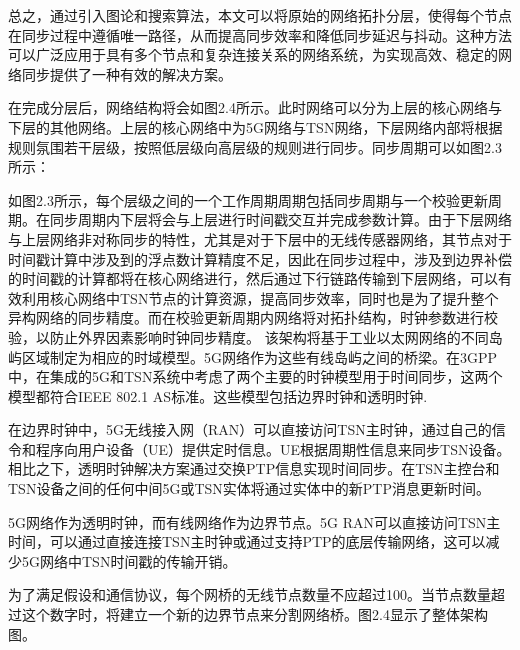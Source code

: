 \documentclass[UTF8,a4paper,12pt]{ctexart}
\numberwithin{equation}{section}
\begin{document}
总之，通过引入图论和搜索算法，本文可以将原始的网络拓扑分层，使得每个节点在同步过程中遵循唯一路径，从而提高同步效率和降低同步延迟与抖动。这种方法可以广泛应用于具有多个节点和复杂连接关系的网络系统，为实现高效、稳定的网络同步提供了一种有效的解决方案。


在完成分层后，网络结构将会如图2.4所示。此时网络可以分为上层的核心网络与下层的其他网络。上层的核心网络中为5G网络与TSN网络，下层网络内部将根据规则氛围若干层级，按照低层级向高层级的规则进行同步。同步周期可以如图2.3所示：

\begin{figure}[htb]
\end{figure}
如图2.3所示，每个层级之间的一个工作周期周期包括同步周期与一个校验更新周期。在同步周期内下层将会与上层进行时间戳交互并完成参数计算。由于下层网络与上层网络非对称同步的特性，尤其是对于下层中的无线传感器网络，其节点对于时间戳计算中涉及到的浮点数计算精度不足，因此在同步过程中，涉及到边界补偿的时间戳的计算都将在核心网络进行，然后通过下行链路传输到下层网络，可以有效利用核心网络中TSN节点的计算资源，提高同步效率，同时也是为了提升整个异构网络的同步精度。而在校验更新周期内网络将对拓扑结构，时钟参数进行校验，以防止外界因素影响时钟同步精度。
该架构将基于工业以太网网络的不同岛屿区域制定为相应的时域模型。5G网络作为这些有线岛屿之间的桥梁。在3GPP中，在集成的5G和TSN系统中考虑了两个主要的时钟模型用于时间同步，这两个模型都符合IEEE 802.1 AS标准。这些模型包括边界时钟和透明时钟\cite{9615318}.

在边界时钟中，5G无线接入网（RAN）可以直接访问TSN主时钟，通过自己的信令和程序向用户设备（UE）提供定时信息。UE根据周期性信息来同步TSN设备。相比之下，透明时钟解决方案通过交换PTP信息实现时间同步。在TSN主控台和TSN设备之间的任何中间5G或TSN实体将通过实体中的新PTP消息更新时间。

5G网络作为透明时钟，而有线网络作为边界节点。5G RAN可以直接访问TSN主时间，可以通过直接连接TSN主时钟或通过支持PTP的底层传输网络，这可以减少5G网络中TSN时间戳的传输开销。

为了满足假设和通信协议，每个网桥的无线节点数量不应超过100。当节点数量超过这个数字时，将建立一个新的边界节点来分割网络桥。图2.4显示了整体架构图。
\end{document}
